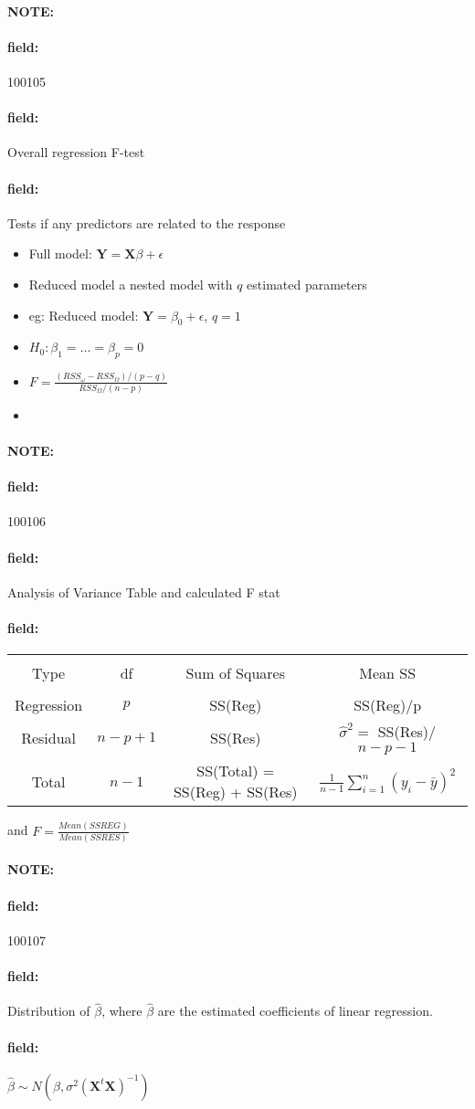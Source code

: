 \documentclass[12pt]{article}
\newenvironment{note}{\paragraph{NOTE:}}{}
\newenvironment{field}{\paragraph{field:}}{}
\begin{document}
\begin{note} \begin{field} \tiny 100105 \end{field}
  \begin{field}
    Overall regression F-test
  \end{field}
  \begin{field}
    Tests if any predictors are related to the response
    \begin{itemize}
      \item Full model: $\mathbf{Y} = \mathbf{X}\beta + \epsilon$
      \item Reduced model a nested model with $q$ estimated parameters
      \item eg: Reduced model: $\mathbf{Y} = \beta_0 + \epsilon$, $q = 1$
      \item $H_0: \beta_1 =  \ldots = \beta_p = 0$
      \item $F = \frac{(RSS_\omega - RSS_\Omega)/(p-q)}{RSS_\Omega/(n-p)}$
      \item
    \end{itemize}
  \end{field}
\end{note}

\begin{note} \begin{field} \tiny 100106 \end{field}
  \begin{field}
    Analysis of Variance Table and calculated F stat
  \end{field}
  \begin{field}
\begin{tabular}{|c|c|c|c|}
  \hline \\
  Type & df & Sum of Squares & Mean SS\\
  \hline \\
  Regression & $p$ & SS(Reg) & SS(Reg)/p\\
  Residual & $n-p+1$ & SS(Res) & $\hat{\sigma}^2 =$ SS(Res)/$n-p-1$\\
  Total & $n-1$ & SS(Total) = SS(Reg) + SS(Res) & $\frac{1}{n-1} \sum_{i=1}^n (y_i - \bar{y})^2$\\
  \hline
\end{tabular}
and $F = \frac{Mean(SSREG)}{Mean(SSRES)}$
\end{field}
\end{note}

\begin{note} \begin{field} \tiny 100107 \end{field}
  \begin{field}
    Distribution of $\hat{\beta}$, where $\hat{\beta}$ are the estimated coefficients of linear regression.
  \end{field}
  \begin{field}
    $\hat{\beta} \sim N(\beta, \sigma^2(\mathbf{X}^t \mathbf{X})^{-1})$
  \end{field}
\end{note}
\end{document}
